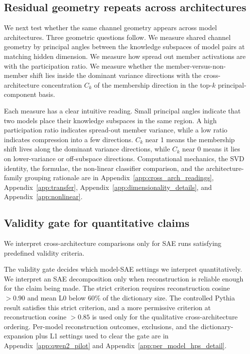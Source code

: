 \subsection{Residual geometry repeats across architectures}
\label{sec:methods:transfer}

We next test whether the same channel geometry appears across model architectures. Three geometric questions follow. We measure shared channel geometry by principal angles between the knowledge subspaces of model pairs at matching hidden dimension. We measure how spread out member activations are with the participation ratio. We measure whether the member-versus-non-member shift lies inside the dominant variance directions with the cross-architecture concentration $C_k$ of the membership direction in the top-$k$ principal-component basis.

Each measure has a clear intuitive reading. Small principal angles indicate that two models place their knowledge subspaces in the same region. A high participation ratio indicates spread-out member variance, while a low ratio indicates compression into a few directions. $C_k$ near 1 means the membership shift lives along the dominant variance directions, while $C_k$ near 0 means it lies on lower-variance or off-subspace directions. Computational mechanics, the SVD identity, the formulae, the non-linear classifier comparison, and the architecture-family grouping rationale are in Appendix~\ref{app:cross_arch_readings}, Appendix~\ref{app:transfer}, Appendix~\ref{app:dimensionality_details}, and Appendix~\ref{app:nonlinear}.

\subsection{Validity gate for quantitative claims}
\label{sec:methods:disclosures}

We interpret cross-architecture comparisons only for SAE runs satisfying predefined validity criteria.

The validity gate decides which model-SAE settings we interpret quantitatively. We interpret an SAE decomposition only when reconstruction is reliable enough for the claim being made. The strict criterion requires reconstruction cosine $> 0.90$ and mean L0 below 60\% of the dictionary size. The controlled Pythia result satisfies this strict criterion, and a more permissive criterion at reconstruction cosine $> 0.85$ is used only for the qualitative cross-architecture ordering. Per-model reconstruction outcomes, exclusions, and the dictionary-expansion plus L1 settings used to clear the gate are in Appendix~\ref{app:qwen2_pilot} and Appendix~\ref{app:per_model_hps_detail}.

